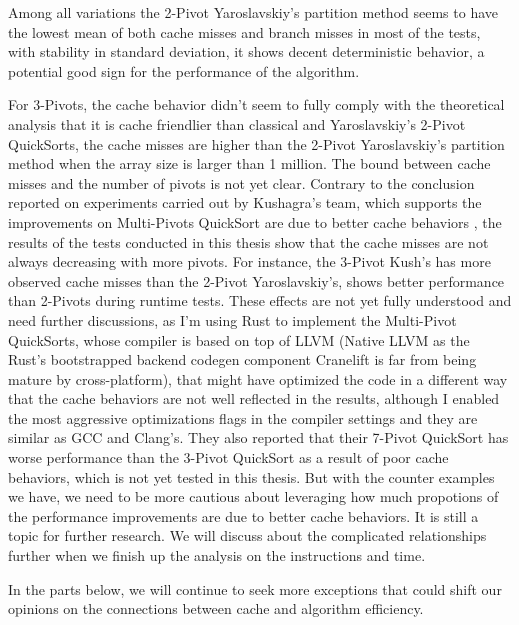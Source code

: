 \documentclass{article}
\begin{document}
Among all variations the 2-Pivot Yaroslavskiy's partition method seems to have the lowest mean of both cache misses and branch misses in most of the tests, with stability in standard deviation,
it shows decent deterministic behavior, a potential good sign for the performance of the algorithm. 

For 3-Pivots, the cache behavior didn't seem to fully comply with the theoretical analysis that it is cache friendlier than classical and Yaroslavskiy's 2-Pivot QuickSorts, 
the cache misses are higher than the 2-Pivot Yaroslavskiy's partition method when the array size is larger than 1 million. The bound between cache misses and the number of pivots is not yet clear.
Contrary to the conclusion reported on experiments carried out by Kushagra's team, which supports the improvements on Multi-Pivots QuickSort are due to better cache behaviors
\cite{Kushagra}, the results of the tests conducted in this thesis show that the cache misses are not always decreasing with more pivots. For instance, the 3-Pivot Kush's has more observed cache misses than the 2-Pivot Yaroslavskiy's,
shows better performance than 2-Pivots during runtime tests. These effects are not yet fully understood and need further discussions, as I'm using Rust to implement the Multi-Pivot QuickSorts,
whose compiler is based on top of LLVM (Native LLVM as the Rust's bootstrapped backend codegen component Cranelift is far from being mature by cross-platform), that might have optimized the code in a different way that the cache behaviors are not well reflected in the results, although I enabled the most aggressive optimizations flags in the compiler settings
and they are similar as GCC and Clang's. They also reported that their 7-Pivot QuickSort has worse performance than the 3-Pivot QuickSort as a result of poor cache behaviors, which is not yet tested in this thesis.
But with the counter examples we have, we need to be more cautious about leveraging how much propotions of the performance improvements are due to better cache behaviors. It is still a topic for further research.
We will discuss about the complicated relationships further when we finish up the analysis on the instructions and time.

In the parts below, we will continue to seek more exceptions that could shift our opinions on the connections between cache and algorithm efficiency.
\end{document}
